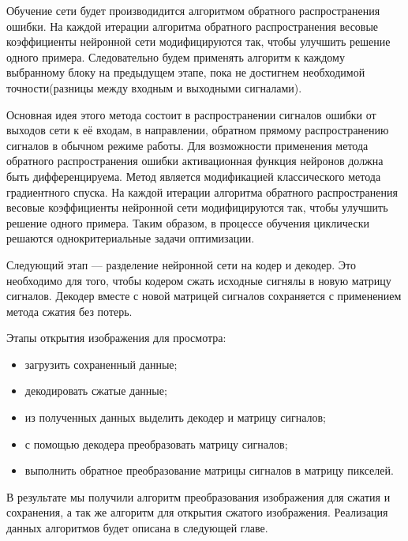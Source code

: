 Обучение сети будет производидится алгоритмом обратного распространения ошибки. На каждой итерации алгоритма обратного распространения
весовые коэффициенты нейронной сети модифицируются так, чтобы улучшить решение одного примера. Следовательно будем применять алгоритм к
каждому выбранному блоку на предыдущем этапе, пока не достигнем необходимой точности(разницы между входным и выходными сигналами).

Основная идея этого метода состоит в распространении сигналов ошибки от выходов сети к её входам, в направлении, обратном прямому распространению сигналов в обычном режиме работы.
Для возможности применения метода обратного распространения ошибки активационная функция нейронов должна быть дифференцируема.
Метод является модификацией классического метода градиентного спуска.
На каждой итерации алгоритма обратного распространения весовые коэффициенты нейронной сети модифицируются так, чтобы улучшить решение одного примера.
Таким образом, в процессе обучения циклически решаются однокритериальные задачи оптимизации.

Следующий этап --- разделение нейронной сети на кодер и декодер. Это необходимо для того, чтобы кодером сжать исходные сигнялы в новую матрицу сигналов.
Декодер вместе с новой матрицей сигналов сохраняется с применением метода сжатия без потерь.

Этапы открытия изображения для просмотра:
\begin{itemize}
  \item загрузить сохраненный данные;
  \item декодировать сжатые данные;
  \item из полученных данных выделить декодер и матрицу сигналов;
  \item с помощью декодера преобразовать матрицу сигналов;
  \item выполнить обратное преобразование матрицы сигналов в матрицу пикселей.
\end{itemize}

В результате мы получили алгоритм преобразования изображения для сжатия и сохранения,
а так же алгоритм для открытия сжатого изображения. Реализация данных алгоритмов будет описана в следующей главе.
